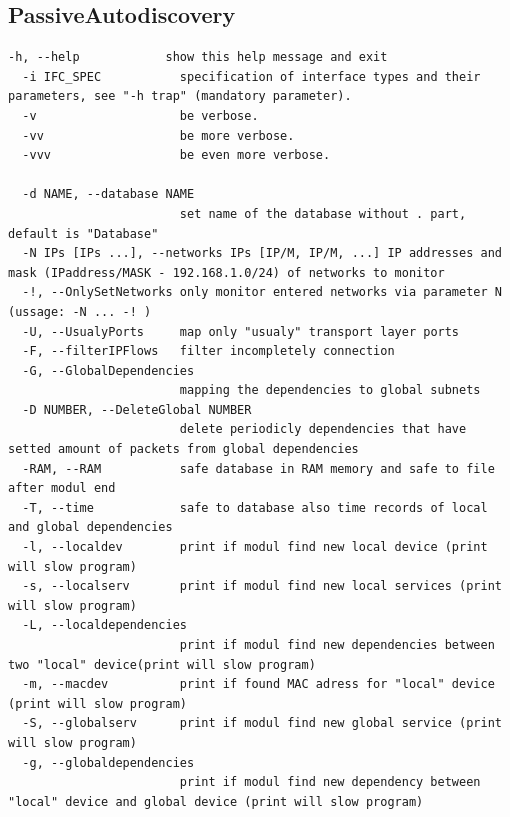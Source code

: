 \documentclass[thesis=B,czech,hidelinks]{FITthesis}[2019/03/21]
\begin{document}
\subsection{PassiveAutodiscovery}
\begin{lstlisting}[style=example]
  -h, --help            show this help message and exit
  -i IFC_SPEC           specification of interface types and their parameters, see "-h trap" (mandatory parameter).
  -v                    be verbose.
  -vv                   be more verbose.
  -vvv                  be even more verbose.
  
  -d NAME, --database NAME
                        set name of the database without . part, default is "Database"
  -N IPs [IPs ...], --networks IPs [IP/M, IP/M, ...] IP addresses and mask (IPaddress/MASK - 192.168.1.0/24) of networks to monitor
  -!, --OnlySetNetworks only monitor entered networks via parameter N (ussage: -N ... -! )
  -U, --UsualyPorts     map only "usualy" transport layer ports
  -F, --filterIPFlows   filter incompletely connection 
  -G, --GlobalDependencies      
                        mapping the dependencies to global subnets
  -D NUMBER, --DeleteGlobal NUMBER
                        delete periodicly dependencies that have setted amount of packets from global dependencies
  -RAM, --RAM           safe database in RAM memory and safe to file after modul end 
  -T, --time            safe to database also time records of local and global dependencies
  -l, --localdev        print if modul find new local device (print will slow program)
  -s, --localserv       print if modul find new local services (print will slow program)
  -L, --localdependencies
                        print if modul find new dependencies between two "local" device(print will slow program)
  -m, --macdev          print if found MAC adress for "local" device (print will slow program)
  -S, --globalserv      print if modul find new global service (print will slow program)
  -g, --globaldependencies
                        print if modul find new dependency between "local" device and global device (print will slow program)
\end{lstlisting}

\newpage
\end{document}
